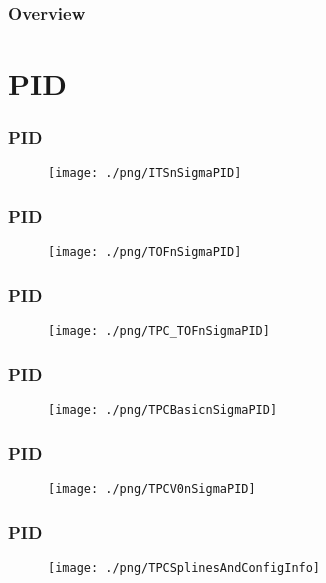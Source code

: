 \documentclass{beamer}
\title[\titlename]{\titlename}
\author{PWG-LF Analysis QA}
\date{\today}
\begin{document}
\begin{frame}
\titlepage 
\end{frame}

\begin{frame}
\frametitle{Overview} %
\tableofcontents      %
\end{frame}


\section{PID}
\begin{frame}
\frametitle{PID}
  \begin{figure}
  \texttt{[image: ./png/ITSnSigmaPID]}
  \end{figure}
\end{frame}
\begin{frame}
\frametitle{PID}
  \begin{figure}
  \texttt{[image: ./png/TOFnSigmaPID]}
  \end{figure}
\end{frame}
\begin{frame}
\frametitle{PID}
  \begin{figure}
  \texttt{[image: ./png/TPC\_TOFnSigmaPID]}
  \end{figure}
\end{frame}
\begin{frame}
\frametitle{PID}
  \begin{figure}
  \texttt{[image: ./png/TPCBasicnSigmaPID]}
  \end{figure}
\end{frame}
\begin{frame}
\frametitle{PID}
  \begin{figure}
  \texttt{[image: ./png/TPCV0nSigmaPID]}
  \end{figure}
\end{frame}
\begin{frame}
\frametitle{PID}
  \begin{figure}
  \texttt{[image: ./png/TPCSplinesAndConfigInfo]}
  \end{figure}
\end{frame}
\end{document}
